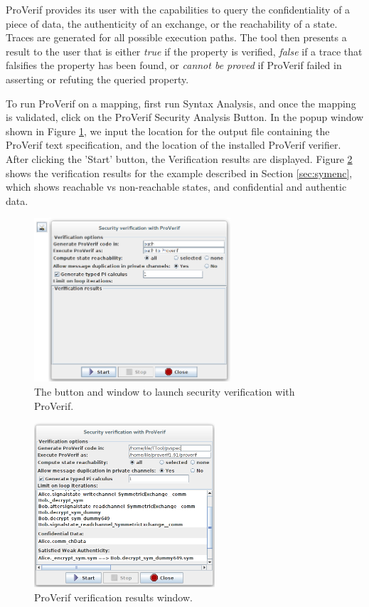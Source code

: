 \documentclass{llncs}
\begin{document}
ProVerif provides its user with the capabilities to query the confidentiality of a piece of data, the authenticity of an
exchange, or the reachability of a state. Traces are generated for all possible execution paths. The tool then presents
a result to the user that is either \textit{true} if the property is verified, \textit{false} if a trace that falsifies
the property has been found, or \textit{cannot be proved} if ProVerif failed in asserting or refuting the queried
property.

To run ProVerif on a mapping, first run Syntax Analysis, and once the mapping is validated, click on the ProVerif Security Analysis Button. In the popup window shown in Figure \ref{fig:ProVerifWindow}, we input the location for the output file containing the ProVerif text specification, and the location of the installed ProVerif verifier. After clicking the 'Start' button, the Verification results are displayed. Figure \ref{fig:ProVerifWindowRes} shows the verification results for the example described in Section \ref{sec:symenc}, which shows reachable vs non-reachable states, and confidential and authentic data.


\begin{figure}[!htbp]
	\centering
	\includegraphics[width=0.65\textwidth]{figures/securityStuff/ProVerifWindow.png}
	\caption{The button and window to launch security verification with ProVerif.}
	\label{fig:ProVerifWindow}
\end{figure}

\begin{figure}[!htbp]
	\centering
	\includegraphics[width=0.6\textwidth]{figures/securityStuff/ProVerifWindowRes.png}
	\caption{ProVerif verification results window.}
	\label{fig:ProVerifWindowRes}
\end{figure}
\end{document}
